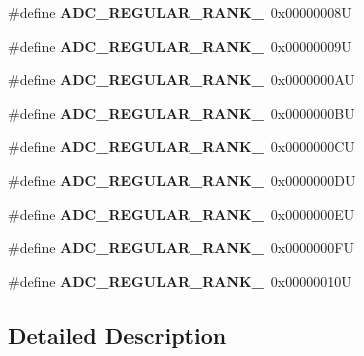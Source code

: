\begin{DoxyCompactItemize}
\item 
\mbox{\label{group___a_d_c__regular__rank_gab39e2e0fb73beec47d249a75a42b5293}} 
\#define {\bfseries A\+D\+C\+\_\+\+R\+E\+G\+U\+L\+A\+R\+\_\+\+R\+A\+N\+K\+\_}~0x00000008U
\item 
\mbox{\label{group___a_d_c__regular__rank_ga2df1ef58ff97a2a6946b4cc0978e9693}} 
\#define {\bfseries A\+D\+C\+\_\+\+R\+E\+G\+U\+L\+A\+R\+\_\+\+R\+A\+N\+K\+\_}~0x00000009U
\item 
\mbox{\label{group___a_d_c__regular__rank_gad969d11913f157d860cc3e8ea81d2bcf}} 
\#define {\bfseries A\+D\+C\+\_\+\+R\+E\+G\+U\+L\+A\+R\+\_\+\+R\+A\+N\+K\+\_}~0x0000000\+AU
\item 
\mbox{\label{group___a_d_c__regular__rank_gada79d07e1e30ef538ae3eb4d611d35a6}} 
\#define {\bfseries A\+D\+C\+\_\+\+R\+E\+G\+U\+L\+A\+R\+\_\+\+R\+A\+N\+K\+\_}~0x0000000\+BU
\item 
\mbox{\label{group___a_d_c__regular__rank_ga038fc7ee28205a62242e105ac4004931}} 
\#define {\bfseries A\+D\+C\+\_\+\+R\+E\+G\+U\+L\+A\+R\+\_\+\+R\+A\+N\+K\+\_}~0x0000000\+CU
\item 
\mbox{\label{group___a_d_c__regular__rank_gaf705597a827461af553a94766ca6e84b}} 
\#define {\bfseries A\+D\+C\+\_\+\+R\+E\+G\+U\+L\+A\+R\+\_\+\+R\+A\+N\+K\+\_}~0x0000000\+DU
\item 
\mbox{\label{group___a_d_c__regular__rank_gab062685d9e3235869566d82891f5842b}} 
\#define {\bfseries A\+D\+C\+\_\+\+R\+E\+G\+U\+L\+A\+R\+\_\+\+R\+A\+N\+K\+\_}~0x0000000\+EU
\item 
\mbox{\label{group___a_d_c__regular__rank_ga36d371d1ced7f233fdf59ffc67234b4d}} 
\#define {\bfseries A\+D\+C\+\_\+\+R\+E\+G\+U\+L\+A\+R\+\_\+\+R\+A\+N\+K\+\_}~0x0000000\+FU
\item 
\mbox{\label{group___a_d_c__regular__rank_ga85f2ea453f67b9a5aad74aa94b696adb}} 
\#define {\bfseries A\+D\+C\+\_\+\+R\+E\+G\+U\+L\+A\+R\+\_\+\+R\+A\+N\+K\+\_}~0x00000010U
\end{DoxyCompactItemize}


\subsection{Detailed Description}
